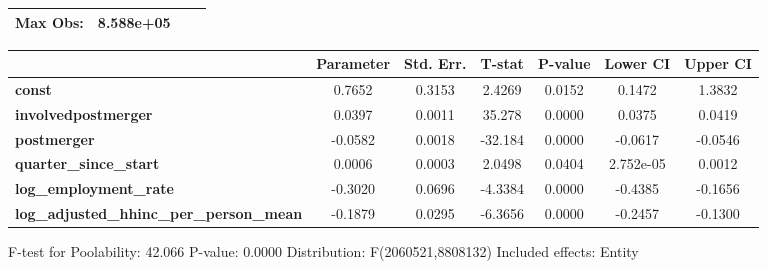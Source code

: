 \documentclass{report}
\begin{document}
\begin{center}
\begin{tabular}{lclc}
\textbf{Max Obs:}                                &      8.588e+05       & \textbf{                     }   &                  \\
\bottomrule
\end{tabular}
\begin{tabular}{lcccccc}
                                                 & \textbf{Parameter} & \textbf{Std. Err.} & \textbf{T-stat} & \textbf{P-value} & \textbf{Lower CI} & \textbf{Upper CI}  \\
\midrule
\textbf{const}                                   &       0.7652       &       0.3153       &      2.4269     &      0.0152      &       0.1472      &       1.3832       \\
\textbf{involvedpostmerger}                      &       0.0397       &       0.0011       &      35.278     &      0.0000      &       0.0375      &       0.0419       \\
\textbf{postmerger}                              &      -0.0582       &       0.0018       &     -32.184     &      0.0000      &      -0.0617      &      -0.0546       \\
\textbf{quarter\_since\_start}                   &       0.0006       &       0.0003       &      2.0498     &      0.0404      &     2.752e-05     &       0.0012       \\
\textbf{log\_employment\_rate}                   &      -0.3020       &       0.0696       &     -4.3384     &      0.0000      &      -0.4385      &      -0.1656       \\
\textbf{log\_adjusted\_hhinc\_per\_person\_mean} &      -0.1879       &       0.0295       &     -6.3656     &      0.0000      &      -0.2457      &      -0.1300       \\
\bottomrule
\end{tabular}
\end{center}

F-test for Poolability: 42.066 \newline
 P-value: 0.0000 \newline
 Distribution: F(2060521,8808132) \newline
  \newline
 Included effects: Entity
\end{document}
